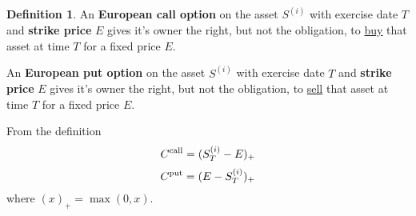 \documentclass[a4paper,12pt, oneside]{book}
\theoremstyle{definition}
\newtheorem{mydef}{Definition}[chapter]
\theoremstyle{remark}
\begin{document}
\begin{mydef}
 An \textbf{European call option} on the asset $S^{(i)}$ with exercise date $T$ and \textbf{strike price} $E$ gives it's owner the right, but not the obligation, to \underline{buy} that asset at time $T$ for a fixed price $E$.
 
 An \textbf{European put option} on the asset $S^{(i)}$ with exercise date $T$ and \textbf{strike price} $E$ gives it's owner the right, but not the obligation, to \underline{sell} that asset at time $T$ for a fixed price $E$.
\end{mydef}
From the definition
\begin{equation}
 \label{eq:ecall}
 C\textsuperscript{call} = (S^{(i)}_T - E)_+
\end{equation}
\begin{equation}
 \label{eq:eput}
 C\textsuperscript{put} = (E - S^{(i)}_T )_+
\end{equation}
where $(x)_+ = \max(0,x)$.
\end{document}
